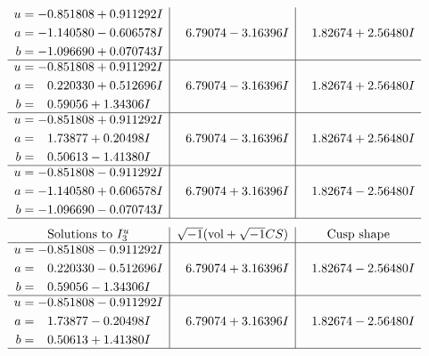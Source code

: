 \documentclass[1p]{elsarticle_modified}
\theoremstyle{definition}
\newcommand{\I}{\sqrt{-1}}
\begin{document}
$$\begin{array}{c|c|c}
\begin{aligned}
u &= -0.851808 + 0.911292 I \\
a &= -1.140580 - 0.606578 I \\
b &= -1.096690 + 0.070743 I\end{aligned}
 & \phantom{-}6.79074 - 3.16396 I & \phantom{-}1.82674 + 2.56480 I \\ \hline\begin{aligned}
u &= -0.851808 + 0.911292 I \\
a &= \phantom{-}0.220330 + 0.512696 I \\
b &= \phantom{-}0.59056 + 1.34306 I\end{aligned}
 & \phantom{-}6.79074 - 3.16396 I & \phantom{-}1.82674 + 2.56480 I \\ \hline\begin{aligned}
u &= -0.851808 + 0.911292 I \\
a &= \phantom{-}1.73877 + 0.20498 I \\
b &= \phantom{-}0.50613 - 1.41380 I\end{aligned}
 & \phantom{-}6.79074 - 3.16396 I & \phantom{-}1.82674 + 2.56480 I \\ \hline\begin{aligned}
u &= -0.851808 - 0.911292 I \\
a &= -1.140580 + 0.606578 I \\
b &= -1.096690 - 0.070743 I\end{aligned}
 & \phantom{-}6.79074 + 3.16396 I & \phantom{-}1.82674 - 2.56480 I\\
 \hline 
 \end{array}$$\newpage$$\begin{array}{c|c|c}  
\text{Solutions to }I^u_{3}& \I (\text{vol} + \sqrt{-1}CS) & \text{Cusp shape}\\
 \hline 
\begin{aligned}
u &= -0.851808 - 0.911292 I \\
a &= \phantom{-}0.220330 - 0.512696 I \\
b &= \phantom{-}0.59056 - 1.34306 I\end{aligned}
 & \phantom{-}6.79074 + 3.16396 I & \phantom{-}1.82674 - 2.56480 I \\ \hline\begin{aligned}
u &= -0.851808 - 0.911292 I \\
a &= \phantom{-}1.73877 - 0.20498 I \\
b &= \phantom{-}0.50613 + 1.41380 I\end{aligned}
 & \phantom{-}6.79074 + 3.16396 I & \phantom{-}1.82674 - 2.56480 I\\
 \hline 
 \end{array}$$\newpage
\end{document}

